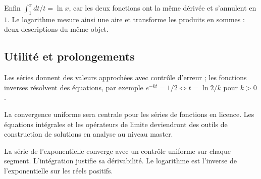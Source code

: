 \documentclass[../cours_1re.tex]{subfiles}
\begin{document}
Enfin $\int_1^xdt/t=\ln x$, car les deux fonctions ont la même dérivée
et s'annulent en $1$. Le logarithme mesure ainsi une aire et transforme
les produits en sommes : deux descriptions du même objet.

\begin{finchapitre}
\section{Utilité et prolongements}
Les séries donnent des valeurs approchées avec contrôle d'erreur ;
les fonctions inverses résolvent des équations, par exemple
$e^{-kt}=1/2\iff t=\ln2/k$ pour $k>0$.

La convergence uniforme sera centrale pour les séries de fonctions en licence.
Les équations intégrales et les opérateurs de limite deviendront des outils
de construction de solutions en analyse au niveau master.
\begin{retenir}
La série de l'exponentielle converge avec un contrôle uniforme sur chaque segment.
L'intégration justifie sa dérivabilité. Le logarithme est l'inverse de l'exponentielle sur les réels positifs.
\end{retenir}
\end{finchapitre}
\end{document}
